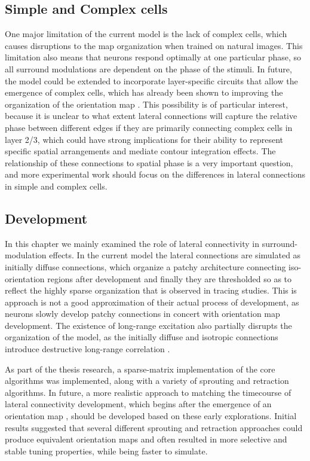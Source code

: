 \subsection{Simple and Complex cells}

One major limitation of the current model is the lack of complex
cells, which causes disruptions to the map organization when trained
on natural images. This limitation also means that neurons respond optimally at
one particular phase, so all surround modulations are dependent on the
phase of the stimuli. In future, the model could be extended to
incorporate layer-specific circuits that allow the emergence of complex
cells, which has already been shown to improving the organization of
the orientation map \citep{Antolik2010}. This possibility is of 
particular interest, because it is unclear to what extent lateral
connections will capture the relative phase between different edges if
they are primarily connecting complex cells in layer 2/3, which could
have strong implications for their ability to represent specific
spatial arrangements and mediate contour integration effects. The
relationship of these connections to spatial phase is a very important
question, and more experimental work should focus on 
the differences in lateral connections in simple and complex cells.

\subsection{Development}

In this chapter we mainly examined the role of lateral connectivity in
surround-modulation effects. In the current model the lateral
connections are simulated as initially diffuse connections, which
organize a patchy architecture connecting iso-orientation regions
after development and finally they are thresholded so as to reflect the
highly sparse organization that is observed in tracing studies. This
is approach is not a good approximation of their actual process of development, as
neurons slowly develop patchy connections in concert with orientation
map development. The existence of long-range excitation also partially
disrupts the organization of the model, as the initially diffuse and
isotropic connections introduce destructive long-range correlation
\citep{Miikkulainen2005}.

As part of the thesis research, a sparse-matrix implementation of the core
algorithms was implemented, along with a variety of sprouting and
retraction algorithms. In future, a more realistic approach to
matching the timecourse of lateral connectivity development, which begins
after the emergence of an orientation map \citep{Ruthazer1996}, should
be developed based on these early explorations. Initial results
suggested that several different sprouting and retraction approaches could produce
equivalent orientation maps and often resulted in more selective and
stable tuning properties, while being faster to simulate.

